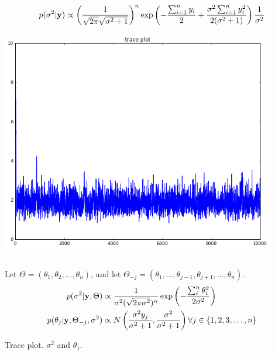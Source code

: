 \documentclass{article}
\begin{document}
	\subsection{}
		\begin{align*}
			p(\sigma^2 | {\bf y}) \propto \left(\frac{1}{\sqrt{2\pi}\sqrt{\sigma^2 + 1}}\right)^{n} \exp \left( -\frac{\sum_{i=1}^{n} y_i}{2} + \frac{\sigma^2 \sum_{i=1}^{n} y_i^2}{2(\sigma^2 + 1)}\right) \frac{1}{\sigma^2}
		\end{align*}
		
		\begin{center}
		\includegraphics[width = 12cm]{1-b.png}
		\end{center}
	\subsection{}
	Let $\Theta = (\theta_1, \theta_2, \dots , \theta_n)$, and let $\Theta_{-j} = (\theta_1, \dots, \theta_{j-1}, \theta_{j+1}, \dots, \theta_n)$.
		\begin{align*}
			p(\sigma^2 | {\bf y}, \Theta) &\propto \frac{1}{\sigma^2(\sqrt{2\pi \sigma^2})^n} \exp\left( -\frac{\sum_i^n \theta_i^2}{2\sigma^2}\right) \\
			p(\theta_j | {\bf y}, \Theta_{-j}, \sigma^2) &\propto N \left( \frac{\sigma^2 y_j}{\sigma^2 + 1}, \frac{\sigma^2}{\sigma^2 + 1}\right) \forall j \in \left\{1, 2, 3, \dots, n \right\} \\
		\end{align*}
		
		Trace plot. $\sigma^2$ and $\theta_1$.
		
\end{document}
